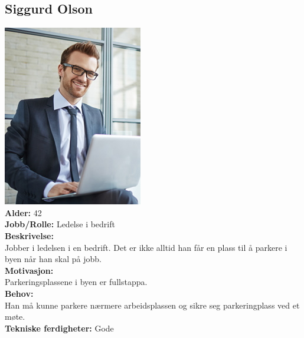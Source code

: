 \documentclass[12pt]{article}
\begin{document}
    \subsection{Siggurd Olson}
    \includegraphics[scale=1]{bilder/personaer/persona_siggurd.jpg}\\
    \textbf{Alder:} 42\\
    \textbf{Jobb/Rolle:} Ledelse i bedrift\\
    \textbf{Beskrivelse:}\\
    Jobber i ledelsen i en bedrift. Det er ikke alltid han får en plass til å parkere i byen når han skal på jobb.\\
    \textbf{Motivasjon:}\\
    Parkeringsplassene i byen er fullstappa.\\
    \textbf{Behov:}\\
    Han må kunne parkere nærmere arbeidsplassen og sikre seg parkeringplass ved et møte.\\
    \textbf{Tekniske ferdigheter:} Gode
\end{document}
